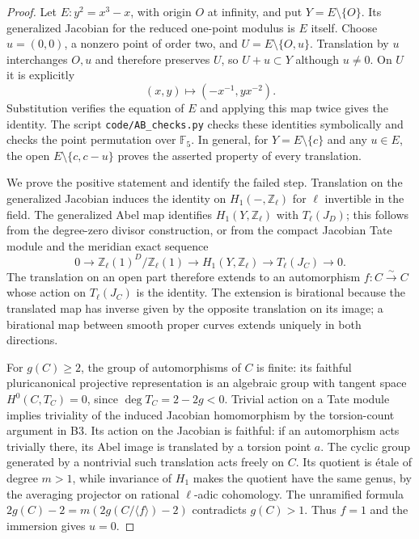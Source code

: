 \begin{proof}
Let $E:y^2=x^3-x$, with origin $O$ at infinity, and put
$Y=E\setminus\{O\}$. Its generalized Jacobian for the reduced one-point
modulus is $E$ itself. Choose $u=(0,0)$, a nonzero point of order two,
and $U=E\setminus\{O,u\}$. Translation by $u$ interchanges $O,u$ and
therefore preserves $U$, so $U+u\subset Y$ although $u\ne0$.
On $U$ it is explicitly
\[
 (x,y)\longmapsto(-x^{-1},yx^{-2}).
\]
Substitution verifies the equation of $E$ and applying this map twice
gives the identity. The script \texttt{code/AB\_checks.py} checks these
identities symbolically and checks the point permutation over $\mathbb F_5$.
In general, for $Y=E\setminus\{c\}$ and any $u\in E$, the open
$E\setminus\{c,c-u\}$ proves the asserted property of every translation.

We prove the positive statement and identify the failed step. Translation
on the generalized Jacobian induces the identity on $H_1(-,\mathbb Z_\ell)$
for $\ell$ invertible in the field. The generalized Abel map identifies
$H_1(Y,\mathbb Z_\ell)$ with $T_\ell(J_D)$; this follows from the
degree-zero divisor construction, or from the compact Jacobian Tate
module and the meridian exact sequence
\[
 0\longrightarrow\mathbb Z_\ell(1)^D/\mathbb Z_\ell(1)
 \longrightarrow H_1(Y,\mathbb Z_\ell)
 \longrightarrow T_\ell(J_C)\longrightarrow0.
\]
The translation on an open part therefore extends to an automorphism
$f:C\xrightarrow\sim C$ whose action on $T_\ell(J_C)$ is the identity.
The extension is birational because the translated map has inverse given
by the opposite translation on its image; a birational map between smooth
proper curves extends uniquely in both directions.

For $g(C)\geq2$, the group of automorphisms of $C$ is finite: its
faithful pluricanonical projective representation is an algebraic group
with tangent space $H^0(C,T_C)=0$, since $\deg T_C=2-2g<0$.
Trivial action on a Tate module implies triviality of the induced
Jacobian homomorphism by the torsion-count argument in B3. Its action
on the Jacobian is faithful: if an automorphism acts trivially there,
its Abel image is translated by a torsion point $a$. The cyclic group
generated by a nontrivial such translation acts freely on $C$. Its quotient
is \'etale of degree $m>1$, while invariance of $H_1$ makes the quotient
have the same genus, by the averaging projector on rational $\ell$-adic
cohomology. The unramified formula
$2g(C)-2=m(2g(C/\langle f\rangle)-2)$ contradicts $g(C)>1$.
Thus $f=1$ and the immersion gives $u=0$.


\end{proof}
